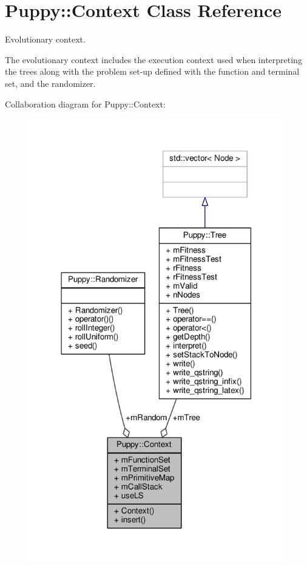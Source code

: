 \hypertarget{classPuppy_1_1Context}{}\section{Puppy\+:\+:Context Class Reference}
\label{classPuppy_1_1Context}


Evolutionary context.

The evolutionary context includes the execution context used when interpreting the trees along with the problem set-\/up defined with the function and terminal set, and the randomizer.  




Collaboration diagram for Puppy\+:\+:Context\+:
\nopagebreak
\begin{figure}[H]
\begin{center}
\leavevmode
\includegraphics[width=314pt]{classPuppy_1_1Context__coll__graph}
\end{center}
\end{figure}
